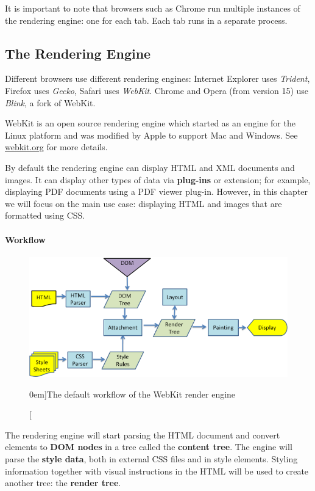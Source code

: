 \documentclass[a4paper, justified, notoc]{tufte-handout} %
\begin{document}
It is important to note that browsers such as Chrome run multiple instances of the rendering engine: one for each tab. Each tab runs in a separate process.

\subsection{The Rendering Engine} %
\label{sub:the_rendering_engine}
Different browsers use different rendering engines: Internet Explorer uses \emph{Trident}, Firefox uses \emph{Gecko}, Safari uses \emph{WebKit}. Chrome and Opera (from version 15) use \emph{Blink}, a fork of WebKit.

WebKit is an open source rendering engine which started as an engine for the Linux platform and was modified by Apple to support Mac and Windows. See \url{webkit.org} for more details.

By default the rendering engine can display HTML and XML documents and images. It can display other types of data via \textbf{plug-ins} or extension; for example, displaying PDF documents using a PDF viewer plug-in. However, in this chapter we will focus on the main use case: displaying HTML and images that are formatted using CSS.

\paragraph{Workflow}

\begin{figure}%
	\centering
  \includegraphics[width=1.0\textwidth]{./figures/webkit_main_flow.png}
  \caption[][0em]{The default workflow of the WebKit render engine}
  \label{fig:webkit_main_flow}
\end{figure}

The rendering engine will start parsing the HTML document and convert elements to \textbf{DOM nodes} in a tree called the \textbf{content tree}. The engine will parse the \textbf{style data}, both in external CSS files and in style elements. Styling information together with visual instructions in the HTML will be used to create another tree: the \textbf{render tree}.
\end{document}
